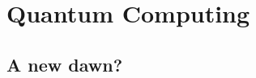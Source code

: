 \documentclass{subfiles}
\begin{document}
\section{Quantum Computing}
\subsection*{A new dawn?}
\end{document}
